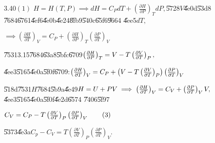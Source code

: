 \documentclass{article}
\begin{document}
3.40$\left( 1\right) $ $H=H\left( T,P\right) \implies dH=C_{P}dT+\left( 
\frac{\partial H}{\partial P}\right) _{T}dP,$\U{5728}$V$\U{4e0d}\U{53d8}%
\U{7684}\U{6761}\U{4ef6}\U{4e0b}\U{4e24}\U{8fb9}\U{540c}\U{65f6}\U{9664}%
\U{4ee5}$dT,$

$\implies \left( \frac{\partial H}{\partial T}\right) _{V}=C_{P}+\left( 
\frac{\partial H}{\partial P}\right) _{T}\left( \frac{\partial P}{\partial T}%
\right) _{V}$

\U{7531}3.15\U{7684}\U{63a8}\U{5bfc}\U{6709}$\left( \frac{\partial H}{%
\partial P}\right) _{T}=V-T\left( \frac{\partial V}{\partial T}\right) _{P},$

\bigskip \U{4ee3}\U{5165}\U{4e0a}\U{5f0f}\U{6709}:$\left( \frac{\partial H}{%
\partial T}\right) _{V}=C_{P}+\left( V-T\left( \frac{\partial V}{\partial T}%
\right) _{P}\right) \left( \frac{\partial P}{\partial T}\right) _{V}\qquad $

\U{518d}\U{7531}$H$\U{7684}\U{5b9a}\U{4e49}$H=U+PV\implies \left( \frac{%
\partial H}{\partial T}\right) _{V}=C_{V}+\left( \frac{\partial P}{\partial T%
}\right) _{V}V,\qquad $\U{4ee3}\U{5165}\U{4e0a}\U{5f0f}\U{4e2d}\U{6574}%
\U{7406}\U{5f97}

$C_{V}=C_{P}-T\left( \frac{\partial V}{\partial T}\right) _{P}\left( \frac{%
\partial P}{\partial T}\right) _{V}\qquad \left( 3\right) $

\U{5373}\U{4e3a}$C_{p}-C_{V}=T\left( \frac{\partial V}{\partial T}\right)
_{P}\left( \frac{\partial P}{\partial T}\right) _{V}.$
\end{document}

